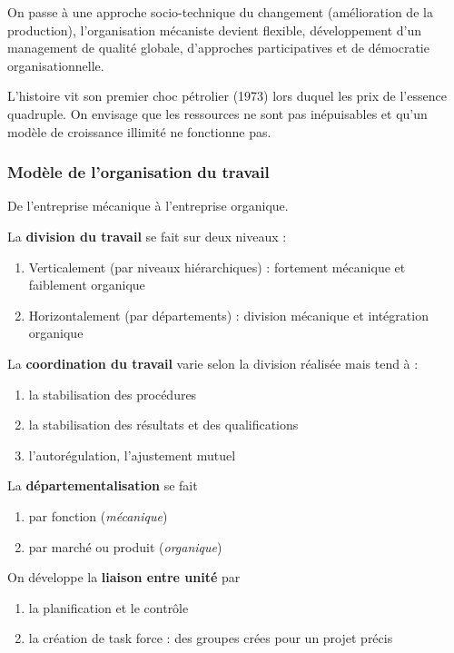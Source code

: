 \documentclass[12pt]{article}
\begin{document}
	On passe à une approche socio-technique du changement (amélioration de la production), l'organisation mécaniste devient flexible, développement d'un management de qualité globale, d'approches participatives et de démocratie organisationnelle.
	
	L'histoire vit son premier choc pétrolier (1973) lors duquel les prix de l'essence quadruple. On envisage que les ressources ne sont pas inépuisables et qu'un modèle de croissance illimité ne fonctionne pas.
	
	\subsubsection{Modèle de l'organisation du travail}
	De l'entreprise mécanique à l'entreprise organique.
	
	La \textbf{division du travail} se fait sur deux niveaux :
	\begin{enumerate}
	 \item Verticalement (par niveaux hiérarchiques) : fortement mécanique et faiblement organique
	 \item Horizontalement (par départements) : division mécanique et intégration organique
	\end{enumerate}
	
	La \textbf{coordination du travail} varie selon la division réalisée mais tend à :
	\begin{enumerate}
	 \item la stabilisation des procédures
	 \item la stabilisation des résultats et des qualifications
	 \item l'autorégulation, l'ajustement mutuel
	\end{enumerate}
	
	La \textbf{départementalisation} se fait
	\begin{enumerate}
	 \item par fonction (\emph{mécanique})
	 \item par marché ou produit (\emph{organique})
	\end{enumerate}
	
	On développe la \textbf{liaison entre unité} par
	\begin{enumerate}
	 \item la planification et le contrôle
	 \item la création de \og{} task force\fg{} : des groupes crées pour un projet précis
	\end{enumerate}
	
\end{document}
